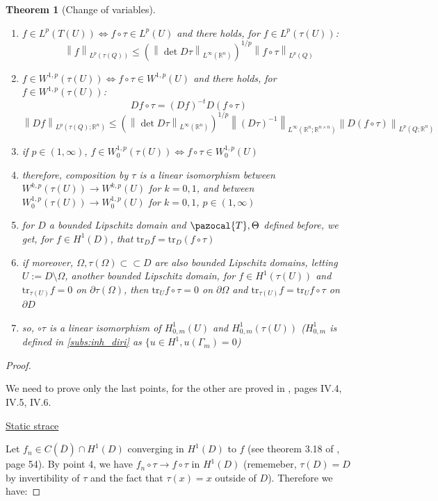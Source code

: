 \documentclass[english,a4paper,9pt,oneside]{scrbook}	%
\theoremstyle{break}
\newtheorem{thm}[equation]{Theorem}
\newenvironment{mproof}[1][\proofname]{%
  \begin{proof}[#1]$ $\par\nobreak\ignorespaces
}{%
  \end{proof}
}
\renewcommand*{\proofname}{Proof}
\theoremstyle{remark}
\newcommand{\mR}{\mathbb{R}}
\newcommand{\norm}[1]{\left\lVert#1\right\rVert}
\newcommand{\tr}{\text{tr}}
\newcommand{\cc}{\subset\subset}
\newcommand{\cT}{\pazocal{T}}
\newcommand{\Te}{\Theta}
\begin{document}
\begin{appendices}
\begin{thm}[Change of variables]
\begin{enumerate}
	\item $f \in L^p(T(U)) \iff f\circ \tau \in L^p(U)$ and there holds, for $f \in L^p(\tau(U))$:
	$$ \norm{f}_{L^p(\tau(Q))}\leq \left ( \norm{\det D\tau}_{L^\infty(\mR^n)}\right)^{1/p} \norm{f\circ \tau}_{L^p(Q)}$$
	\item $f \in W^{1,p}(\tau(U)) \iff f\circ \tau \in W^{1,p}(U)$ and there holds, for $f\in W^{1,p}(\tau(U))$:
	$$Df \circ \tau = (Df)^{-t}D(f\circ \tau)$$
	$$ \norm{Df}_{L^p(\tau(Q);\mR^n)}\leq \left ( \norm{\det D\tau}_{L^\infty(\mR^n)}\right)^{1/p} \norm{(D\tau)^{-1}}_{L^\infty(\mR^n;\mR^{n\times n})}\norm{D(f\circ \tau)}_{L^p(Q;\mR^n)}$$
	\item if $p \in (1, \infty)$, $f \in W^{1,p}_0(\tau(U)) \iff f\circ \tau \in W^{1,p}_0(U)$
	\item therefore, composition by $\tau$ is a linear isomorphism between $W^{k,p}(\tau(U))\rightarrow W^{k,p}(U)$ for $k=0,1$, and between $W^{1,p}_0(\tau(U))\rightarrow W^{1,p}_0(U)$ for $k=0,1$, $p \in (1, \infty)$
	\item for $D$ a bounded Lipschitz domain and $\cT, \Te$ defined before, we get, for $f \in H^1(D)$, that $\tr_D f = \tr_D(f\circ \tau)$
	\item if moreover, $\Omega, \tau(\Omega) \cc D$ are also bounded Lipschitz domains, letting $U:=D\setminus \Omega$, another bounded Lipschitz domain, for $f \in H^1(\tau(U))$ and $\tr_{\tau(U)} f =0 $ on $ \partial \tau(\Omega) $, then $\tr_{U} f\circ \tau=0$ on $\partial \Omega$ and $\tr_{\tau(U)} f = \tr_{U} f\circ \tau$ on $\partial D$
	\item so, $\circ \tau$ is a linear isomorphism of $H^1_{0,m}(U)$ and $H^1_{0,m}(\tau(U))$ ($H^1_{0,m}$ is defined in \cref{subs:inh_diri} as $\{u \in H^1, u(\Gamma_m)=0$)
\end{enumerate}

\end{thm}

\begin{mproof}

We need to prove only the last points, for the other are proved in \cite{murat}, pages IV.4, IV.5, IV.6.

\underline{Static strace}

Let $f_n \in C(\overline{D})\cap H^1(D)$ converging in $H^1(D)$ to $f$ (see theorem 3.18 of \cite{adams}, page 54). By point 4, we have $f_n \circ \tau\rightarrow f\circ \tau$ in $H^1(D)$ (rememeber, $\tau(D)=D$ by invertibility of $\tau$ and the fact that $\tau(x)=x$ outside of $D$). Therefore we have:


\end{mproof}
\end{appendices}
\end{document}
